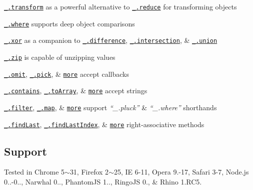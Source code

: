 \begin{DoxyItemize}
\item \href{https://lodash.com/docs#transform}{\tt \+\_\+.\+transform} as a powerful alternative to \href{https://lodash.com/docs#reduce}{\tt \+\_\+.\+reduce} for transforming objects
\item \href{https://lodash.com/docs#where}{\tt \+\_\+.\+where} supports deep object comparisons
\item \href{https://lodash.com/docs#xor}{\tt \+\_\+.\+xor} as a companion to \href{https://lodash.com/docs#difference}{\tt \+\_\+.\+difference}, \href{https://lodash.com/docs#intersection}{\tt \+\_\+.\+intersection}, \& \href{https://lodash.com/docs#union}{\tt \+\_\+.\+union}
\item \href{https://lodash.com/docs#zip}{\tt \+\_\+.\+zip} is capable of unzipping values
\item \href{https://lodash.com/docs#omit}{\tt \+\_\+.\+omit}, \href{https://lodash.com/docs#pick}{\tt \+\_\+.\+pick}, \& \href{https://lodash.com/docs}{\tt more} accept callbacks
\item \href{https://lodash.com/docs#contains}{\tt \+\_\+.\+contains}, \href{https://lodash.com/docs#toArray}{\tt \+\_\+.\+to\+Array}, \& \href{https://lodash.com/docs}{\tt more} accept strings
\item \href{https://lodash.com/docs#filter}{\tt \+\_\+.\+filter}, \href{https://lodash.com/docs#map}{\tt \+\_\+.\+map}, \& \href{https://lodash.com/docs}{\tt more} support {\itshape “\+\_\+.\+pluck”} \& {\itshape “\+\_\+.\+where”} shorthands
\item \href{https://lodash.com/docs#findLast}{\tt \+\_\+.\+find\+Last}, \href{https://lodash.com/docs#findLastIndex}{\tt \+\_\+.\+find\+Last\+Index}, \& \href{https://lodash.com/docs}{\tt more} right-\/associative methods
\end{DoxyItemize}

\subsection*{Support}

Tested in Chrome 5$\sim$31, Firefox 2$\sim$25, IE 6-\/11, Opera 9.-\/17, Safari 3-\/7, Node.\+js 0..-\/0.., Narwhal 0.., Phantom\+JS 1.., Ringo\+JS 0., \& Rhino 1.\+R\+C5. 